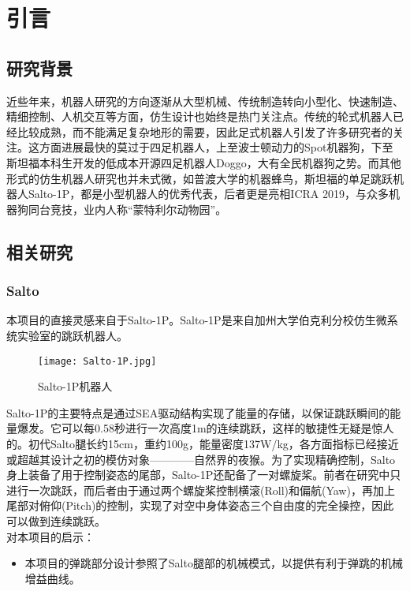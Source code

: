 
\chapter{引言}
\label{cha:intro}

\section{研究背景}
近些年来，机器人研究的方向逐渐从大型机械、传统制造转向小型化、快速制造、精细控制、人机交互等方面，仿生设计也始终是热门关注点。传统的轮式机器人已经比较成熟，而不能满足复杂地形的需要，因此足式机器人引发了许多研究者的关注。这方面进展最快的莫过于四足机器人，上至波士顿动力的Spot机器狗\cite{Spot}，下至斯坦福本科生开发的低成本开源四足机器人Doggo\cite{Doggo}，大有全民机器狗之势。而其他形式的仿生机器人研究也并未式微，如普渡大学的机器蜂鸟\cite{Hummingbird}，斯坦福的单足跳跃机器人Salto-1P\cite{Salto1P}，都是小型机器人的优秀代表，后者更是亮相ICRA 2019，与众多机器狗同台竞技，业内人称“蒙特利尔动物园”。

\section{相关研究}
\label{sec:first}
\subsection{Salto}
本项目的直接灵感来自于Salto-1P。Salto-1P是来自加州大学伯克利分校仿生微系统实验室的跳跃机器人。
\begin{figure}[H]
  \centering
  \texttt{[image: Salto-1P.jpg]}
  \caption{Salto-1P机器人\cite{Salto1P}}
  \label{fig:salto-1p}
\end{figure}
Salto-1P的主要特点是通过SEA驱动结构实现了能量的存储，以保证跳跃瞬间的能量爆发。它可以每0.58秒进行一次高度1m的连续跳跃，这样的敏捷性无疑是惊人的。初代Salto\cite{Salto}腿长约15cm，重约100g，能量密度137W/kg，各方面指标已经接近或超越其设计之初的模仿对象————自然界的夜猴。为了实现精确控制，Salto身上装备了用于控制姿态的尾部，Salto-1P还配备了一对螺旋桨。前者在研究中只进行一次跳跃，而后者由于通过两个螺旋桨控制横滚(Roll)和偏航(Yaw)，再加上尾部对俯仰(Pitch)的控制，实现了对空中身体姿态三个自由度的完全操控，因此可以做到连续跳跃。\\
对本项目的启示：
\begin{itemize}
  \item 本项目的弹跳部分设计参照了Salto腿部的机械模式，以提供有利于弹跳的机械增益曲线。
\end{itemize}
